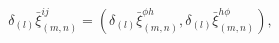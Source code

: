 \begin{equation*}
\delta _{(l)}\bar{\xi}_{(m,n)}^{ij}=(\delta _{(l)}\bar{\xi}_{(m,n)}^{\phi
h},\delta _{(l)}\bar{\xi}_{(m,n)}^{h\phi }),
\end{equation*}

